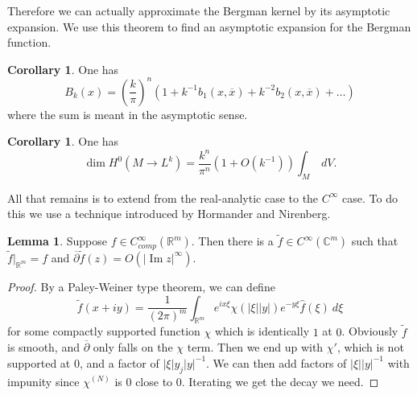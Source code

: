 \documentclass[12pt]{report}
\newcommand{\RR}{\mathbb{R}}
\newcommand{\CC}{\mathbb{C}}
\newcommand{\dbar}{\overline \partial}
\renewcommand{\Im}{\operatorname{Im}}
\theoremstyle{definition}
\newtheorem{lemma}[theorem]{Lemma}
\newtheorem{corollary}[theorem]{Corollary}
\begin{document}
    Therefore we can actually approximate the Bergman kernel by its asymptotic expansion. We use this theorem to find an asymptotic expansion for the Bergman function.
\begin{corollary}
    One has
    $$B_k(x) = \left(\frac{k}{\pi}\right)^n(1 + k^{-1}b_1(x, \overline x) + k^{-2}b_2(x, \overline x) + \dots)$$
    where the sum is meant in the asymptotic sense.
\end{corollary}
\begin{corollary}
    One has
    $$\dim H^0(M \to L^k) = \frac{k^n}{\pi^n}(1 + O(k^{-1})) \int_M ~dV.$$
\end{corollary}
    All that remains is to extend from the real-analytic case to the $C^\infty$ case. To do this we use a technique introduced by Hormander and Nirenberg.
\begin{lemma}
    Suppose $f \in C^\infty_{comp}(\RR^m)$. Then there is a $\tilde f \in C^\infty(\CC^m)$ such that $\tilde f|_{\RR^m} =f$ and $\dbar \tilde f(z) = O(|\Im z|^\infty)$.
\end{lemma}
\begin{proof}
    By a Paley-Weiner type theorem, we can define
    $$\tilde f(x + iy) = \frac{1}{(2\pi)^m} \int_{\RR^m} e^{ix\xi} \chi(|\xi||y|)e^{-y\xi} \hat f(\xi) ~d\xi$$
    for some compactly supported function $\chi$ which is identically $1$ at $0$. Obviously $\tilde f$ is smooth, and $\dbar$ only falls on the $\chi$ term. Then we end up with $\chi'$, which is not supported at $0$, and a factor of $|\xi|y_j|y|^{-1}$. We can then add factors of $|\xi||y|^{-1}$ with impunity since $\chi^{(N)}$ is $0$ close to $0$. Iterating we get the decay we need.
\end{proof}
\end{document}
